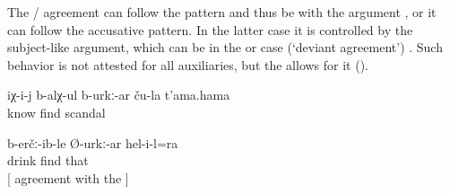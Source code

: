 The / agreement can follow the  pattern and thus be with the  argument , or it can follow the accusative pattern. In the latter case it is controlled by the subject-like argument, which can be in the  or  case (`deviant  agreement') . Such behavior is not attested for all auxiliaries, but the  allows for it ().
%
\begin{exe}
	\ex	\label{ex:He probably knows their scandal@19}
	\gll	iχ-i-j	b-alχ-ul	b-urkː-ar	ču-la	t'ama.hama\\
			know	find		scandal\\
	\glt	{}

	\ex	\label{ex:He also drank probably agreement with ergative@18}
	\gll	b-erčː-ib-le	Ø-urkː-ar	hel-i-l=ra\\
		drink	find		that\\
	\glt	{} [ agreement with the ]
\end{exe}

